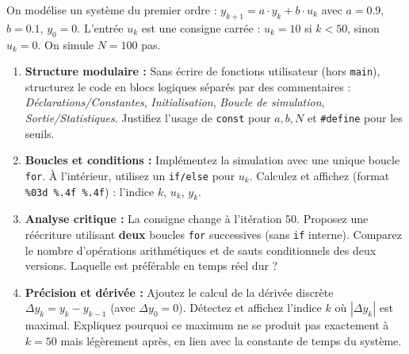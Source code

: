 \documentclass[11pt]{article}
\begin{document}
\begin{exercice}
On modélise un système du premier ordre : $y_{k+1} = a \cdot y_k + b \cdot u_k$ avec $a=0.9$, $b=0.1$, $y_0=0$. L'entrée $u_k$ est une consigne carrée : $u_k = 10$ si $k < 50$, sinon $u_k = 0$. On simule $N=100$ pas.
\begin{enumerate}
    \item \textbf{Structure modulaire :} Sans écrire de fonctions utilisateur (hors \texttt{main}), structurez le code en blocs logiques séparés par des commentaires : \textit{Déclarations/Constantes}, \textit{Initialisation}, \textit{Boucle de simulation}, \textit{Sortie/Statistiques}. Justifiez l'usage de \texttt{const} pour $a, b, N$ et \texttt{\#define} pour les seuils.
    \item \textbf{Boucles et conditions :} Implémentez la simulation avec une unique boucle \texttt{for}. À l'intérieur, utilisez un \texttt{if/else} pour $u_k$. Calculez et affichez (format \texttt{\%03d \%.4f \%.4f}) : l'indice $k$, $u_k$, $y_k$.
    \item \textbf{Analyse critique :} La consigne change à l'itération 50. Proposez une réécriture utilisant \textbf{deux} boucles \texttt{for} successives (sans \texttt{if} interne). Comparez le nombre d'opérations arithmétiques et de sauts conditionnels des deux versions. Laquelle est préférable en temps réel dur ?
    \item \textbf{Précision et dérivée :} Ajoutez le calcul de la dérivée discrète $\Delta y_k = y_k - y_{k-1}$ (avec $\Delta y_0 = 0$). Détectez et affichez l'indice $k$ où $|\Delta y_k|$ est maximal. Expliquez pourquoi ce maximum ne se produit pas exactement à $k=50$ mais légèrement après, en lien avec la constante de temps du système.
\end{enumerate}
\end{exercice}
\end{document}
